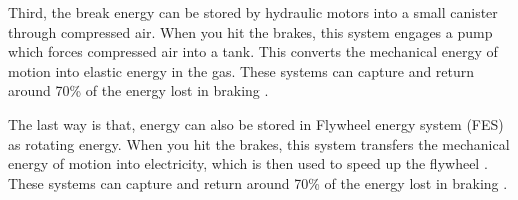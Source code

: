 Third, the break energy can be stored by hydraulic motors into a small canister through compressed air. When you hit the brakes, this system engages a pump which forces compressed air into a tank.
This converts the mechanical energy of motion into elastic energy in the gas.
These systems can capture and return around 70\% of the energy lost in braking \cite{JX_2002013128,JX_2008valents}.

The last way is that, energy can also be stored in Flywheel energy system (FES) as rotating energy.
When you hit the brakes, this system transfers the mechanical energy of motion into electricity, which is then used to speed up the flywheel \cite{JX_5472647,JX_5686984,JX_993788}.
These systems can capture and return around 70\% of the energy lost in braking \cite{JX_DATE}.


